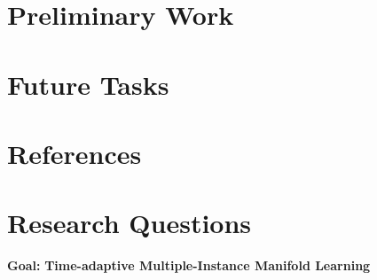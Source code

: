 \documentclass{article}[10 pt]
\begin{document}
\section{Preliminary Work}

\section{Future Tasks}

\section{References}



\newpage
\section*{Research Questions}

\textbf{Goal:} \textbf{Time-adaptive Multiple-Instance Manifold Learning} 
\end{document}
